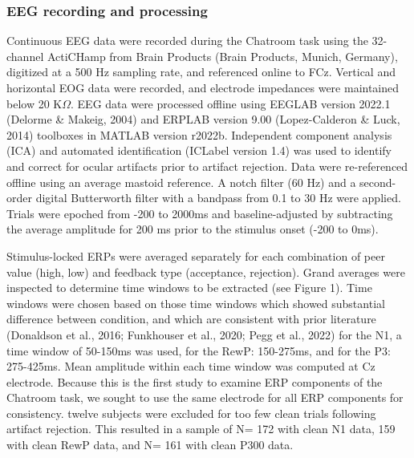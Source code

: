 \documentclass[
  man]{apa7}
\begin{document}
\hypertarget{eeg-recording-and-processing}{%
\subsubsection{EEG recording and processing}\label{eeg-recording-and-processing}}

Continuous EEG data were recorded during the Chatroom task using the 32-channel ActiCHamp from Brain Products (Brain Products, Munich, Germany), digitized at a 500 Hz sampling rate, and referenced online to FCz. Vertical and horizontal EOG data were recorded, and electrode impedances were maintained below 20 K\(\Omega\). EEG data were processed offline using EEGLAB version 2022.1 (Delorme \& Makeig, 2004) and ERPLAB version 9.00 (Lopez-Calderon \& Luck, 2014) toolboxes in MATLAB version r2022b. Independent component analysis (ICA) and automated identification (ICLabel version 1.4) was used to identify and correct for ocular artifacts prior to artifact rejection. Data were re-referenced offline using an average mastoid reference. A notch filter (60 Hz) and a second-order digital Butterworth filter with a bandpass from 0.1 to 30 Hz were applied. Trials were epoched from -200 to 2000ms and baseline-adjusted by subtracting the average amplitude for 200 ms prior to the stimulus onset (-200 to 0ms).

Stimulus-locked ERPs were averaged separately for each combination of peer value (high, low) and feedback type (acceptance, rejection). Grand averages were inspected to determine time windows to be extracted (see Figure 1). Time windows were chosen based on those time windows which showed substantial difference between condition, and which are consistent with prior literature (Donaldson et al., 2016; Funkhouser et al., 2020; Pegg et al., 2022) for the N1, a time window of 50-150ms was used, for the RewP: 150-275ms, and for the P3: 275-425ms. Mean amplitude within each time window was computed at Cz electrode. Because this is the first study to examine ERP components of the Chatroom task, we sought to use the same electrode for all ERP components for consistency. twelve subjects were excluded for too few clean trials following artifact rejection. This resulted in a sample of N= 172 with clean N1 data, 159 with clean RewP data, and N= 161 with clean P300 data.
\end{document}

